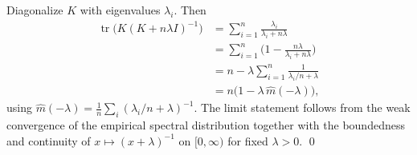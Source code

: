 Diagonalize $K$ with eigenvalues $\lambda_i$. Then
\[
\begin{aligned}
\operatorname{tr}\big(K(K+n\lambda I)^{-1}\big)
&=\sum_{i=1}^n\frac{\lambda_i}{\lambda_i+n\lambda}\\
&=\sum_{i=1}^n\Big(1-\frac{n\lambda}{\lambda_i+n\lambda}\Big)\\
&= n-\lambda\sum_{i=1}^n\frac{1}{\lambda_i/n+\lambda}\\
&= n\big(1-\lambda\,\widehat m(-\lambda)\big),
\end{aligned}
\]
using $\widehat m(-\lambda)=\tfrac1n\sum_i(\lambda_i/n+\lambda)^{-1}$. The
limit statement follows from the weak convergence of the empirical spectral
distribution together with the boundedness and continuity of
$x\mapsto(x+\lambda)^{-1}$ on $[0,\infty)$ for fixed $\lambda>0$. \qed
